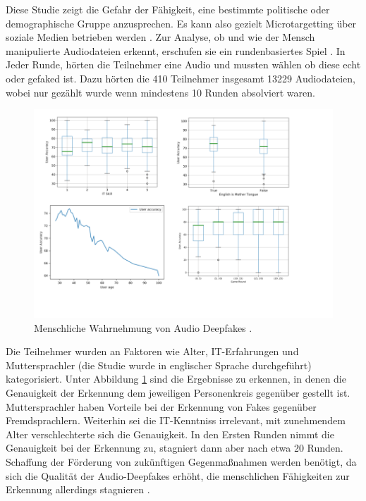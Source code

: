 Diese Studie zeigt die Gefahr der Fähigkeit, eine bestimmte politische oder demographische Gruppe anzusprechen.
Es kann also gezielt Microtargetting über soziale Medien betrieben werden \citep[Vgl.][]{Hancock2021}.
\newpage
Zur Analyse, ob und wie der Mensch manipulierte Audiodateien erkennt, erschufen sie ein rundenbasiertes Spiel \citep[][]{Mueller2022}.
In Jeder Runde, hörten die Teilnehmer eine Audio und mussten wählen ob diese echt oder gefaked ist.
Dazu hörten die 410 Teilnehmer insgesamt 13229 Audiodateien, wobei nur gezählt wurde wenn mindestens 10 Runden absolviert waren.
\par
\begin{figure}[h]
 \centering
 \includegraphics[width=\textwidth]{Assets/ResultsHumanDetectionDeepFake.png}
 \caption{Menschliche Wahrnehmung von Audio Deepfakes \citep[][]{Mueller2022}.}
 \label{fig:ResultsDetectionDeepfake}
\end{figure}
Die Teilnehmer wurden an Faktoren wie Alter, IT-Erfahrungen und Muttersprachler (die Studie wurde in englischer Sprache durchgeführt) kategorisiert.
Unter Abbildung \ref{fig:ResultsDetectionDeepfake} sind die Ergebnisse zu erkennen, in denen die Genauigkeit der Erkennung dem jeweiligen Personenkreis gegenüber gestellt ist.
Muttersprachler haben Vorteile bei der Erkennung von Fakes gegenüber Fremdsprachlern.
Weiterhin sei die IT-Kenntniss irrelevant, mit zunehmendem Alter verschlechterte sich die Genauigkeit. 
In den Ersten Runden nimmt die Genauigkeit bei der Erkennung zu, stagniert dann aber nach etwa 20 Runden.
Schaffung der Förderung von zukünftigen Gegenmaßnahmen werden benötigt, da sich die Qualität der Audio-Deepfakes erhöht, die menschlichen Fähigkeiten zur Erkennung allerdings stagnieren \citep[][]{Mueller2022}.
